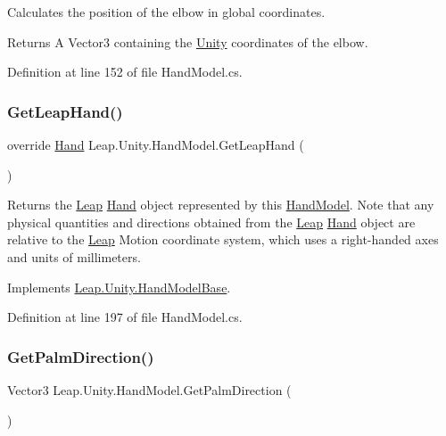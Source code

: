 Calculates the position of the elbow in global coordinates. \begin{DoxyReturn}{Returns}
A Vector3 containing the \mbox{\hyperlink{namespace_leap_1_1_unity}{Unity}} coordinates of the elbow. 
\end{DoxyReturn}


Definition at line 152 of file Hand\+Model.\+cs.

\mbox{\label{class_leap_1_1_unity_1_1_hand_model_a8b8afb06879194f1c63089f0c0202b26}} 
\subsubsection{\texorpdfstring{GetLeapHand()}{GetLeapHand()}}
{\footnotesize\ttfamily override \mbox{\hyperlink{class_leap_1_1_hand}{Hand}} Leap.\+Unity.\+Hand\+Model.\+Get\+Leap\+Hand (\begin{DoxyParamCaption}{ }\end{DoxyParamCaption})\hspace{0.3cm}{\ttfamily [virtual]}}

Returns the \mbox{\hyperlink{namespace_leap_1_1_unity_1_1_leap}{Leap}} \mbox{\hyperlink{class_leap_1_1_hand}{Hand}} object represented by this \mbox{\hyperlink{class_leap_1_1_unity_1_1_hand_model}{Hand\+Model}}. Note that any physical quantities and directions obtained from the \mbox{\hyperlink{namespace_leap_1_1_unity_1_1_leap}{Leap}} \mbox{\hyperlink{class_leap_1_1_hand}{Hand}} object are relative to the \mbox{\hyperlink{namespace_leap_1_1_unity_1_1_leap}{Leap}} Motion coordinate system, which uses a right-\/handed axes and units of millimeters. 

Implements \mbox{\hyperlink{class_leap_1_1_unity_1_1_hand_model_base_aa24ca02bf4a64ba33b0370ad6da8731f}{Leap.\+Unity.\+Hand\+Model\+Base}}.



Definition at line 197 of file Hand\+Model.\+cs.

\mbox{\label{class_leap_1_1_unity_1_1_hand_model_a36406d60c04839c2ebce7abdf128bda4}} 
\subsubsection{\texorpdfstring{GetPalmDirection()}{GetPalmDirection()}}
{\footnotesize\ttfamily Vector3 Leap.\+Unity.\+Hand\+Model.\+Get\+Palm\+Direction (\begin{DoxyParamCaption}{ }\end{DoxyParamCaption})}

